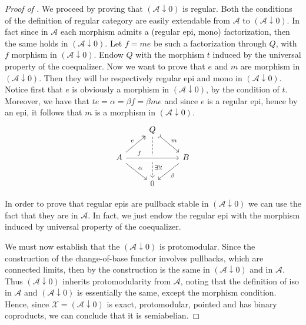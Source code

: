 \begin{subbox}{}
\begin{proof}[\textit{Proof of }]
    We proceed by proving that $(\mathcal{A} \downarrow 0)$ is regular. Both the conditions of the definition of regular category are easily extendable from $\mathcal{A}$ to $(\mathcal{A} \downarrow 0)$. In fact since in $\mathcal{A}$ each morphism admits a (regular epi, mono) factorization, then the same holds in $(\mathcal{A} \downarrow 0)$. Let $f=me$ be such a factorization through $Q$, with $f$ morphism in $(\mathcal{A} \downarrow 0)$. Endow $Q$ with the morphism $t$ induced by the universal property of the coequalizer. Now we want to prove that $e$ and $m$ are morphism in $(\mathcal{A} \downarrow 0)$. Then they will be respectively regular epi and mono in $(\mathcal{A} \downarrow 0)$. Notice first that $e$ is obviously a morphism in $(\mathcal{A} \downarrow 0)$, by the condition of $t$. Moreover, we have that $te=\alpha=\beta f= \beta me$ and since $e$ is a regular epi, hence by  an epi, it follows that $m$ is a morphism in $(\mathcal{A} \downarrow 0)$.
    \[
\begin{tikzcd}
    & Q \arrow[rd, "m", tail] \arrow[dd, "\exists ! t", pos=0.75, dashed] &                       \\
A \arrow[rr, "f", pos=0.25, crossing over] \arrow[ru, "e", two heads] \arrow[rd, "\alpha"] &                                                           & B \arrow[ld, "\beta"] \\
    & 0                                                         &                      
\end{tikzcd}
    \]

    In order to prove that regular epis are pullback stable in $(\mathcal{A} \downarrow 0)$ we can use the fact that they are in $\mathcal{A}$. In fact, we just endow the regular epi with the morphism induced by universal property of the coequalizer.

    We must now establish that the $(\mathcal{A} \downarrow 0)$ is protomodular. Since the construction of the change-of-base functor involves pullbacks, which are connected limits, then by  the construction is the same in $(\mathcal{A} \downarrow 0)$ and in $\mathcal{A}$. Thus $(\mathcal{A} \downarrow 0)$ inherits protomodularity from $\mathcal{A}$, noting that the definition of iso in $\mathcal{A}$ and $(\mathcal{A} \downarrow 0)$ is essentially the same, except the morphism condition. Hence, since $\mathcal{X} = (\mathcal{A} \downarrow 0)$ is exact, protomodular, pointed and has binary coproducts, we can conclude that it is semiabelian.


\end{proof}
\end{subbox}
